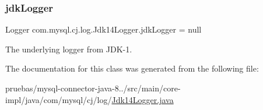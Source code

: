 \subsubsection{\texorpdfstring{jdk\+Logger}{jdkLogger}}
{\footnotesize\ttfamily Logger com.\+mysql.\+cj.\+log.\+Jdk14\+Logger.\+jdk\+Logger = null\hspace{0.3cm}{\ttfamily [protected]}}

The underlying logger from J\+D\+K-\/1. 

The documentation for this class was generated from the following file\+:\begin{DoxyCompactItemize}
\item 
pruebas/mysql-\/connector-\/java-\/8../src/main/core-\/impl/java/com/mysql/cj/log/\mbox{\hyperlink{_jdk14_logger_8java}{Jdk14\+Logger.\+java}}\end{DoxyCompactItemize}
